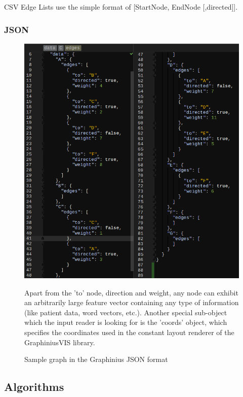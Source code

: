 		CSV Edge Lists use the simple format of [StartNode, EndNode [,directed]].		
		
		
		\subsubsection{JSON}
		\label{sssection: io_json}
		
		\begin{figure}[ht]
			\centering
			\hspace*{-1.5cm}
			\includegraphics[width=1.2\textwidth]{figures/search_graph_json}
			\caption{Sample graph in the Graphinius JSON format}
			\label{fig:json_input_graph}
			\small Apart from the 'to' node, direction and weight, any node can exhibit an arbitrarily large feature vector containing any type of information (like patient data, word vectors, etc.). Another special sub-object which the input reader is looking for is the 'coords' object, which specifies the coordinates used in the constant layout renderer of the GraphiniusVIS library.
		\end{figure}
	
	
	\subsection{Algorithms}
	\label{ssect:algorithms}
	
